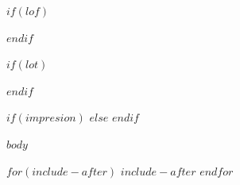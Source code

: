$if(lof)$
\clearpage
\thispagestyle{plain}
\listoffigures
$endif$


$if(lot)$
\clearpage
\thispagestyle{plain}
\listoftables
$endif$


$if(impresion)$
\clearpage
\makeatletter
\ifodd\c@page\else
  \hbox{}\thispagestyle{empty}\clearpage
\fi
\makeatother
{}
$else$
\clearpage
{}
$endif$

$body$

$for(include-after)$
$include-after$
$endfor$


